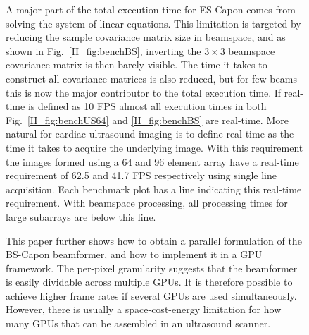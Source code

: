 \begin{figure}[!t]
A major part of the total execution time for ES-Capon comes from solving the system of linear equations. This limitation is targeted by reducing the sample covariance matrix size in beamspace, and as shown in Fig.\ \ref{II_fig:benchBS}, inverting the $3\times3$ beamspace covariance matrix is then barely visible. The time it takes to construct all covariance matrices is also reduced, but for few beams this is now the major contributor to the total execution time. If real-time is defined as 10 FPS \cite{Chen2011} almost all execution times in both Fig.\ \ref{II_fig:benchUS64} and \ref{II_fig:benchBS} are real-time. More natural for cardiac ultrasound imaging is to define real-time as the time it takes to acquire the underlying image. With this requirement the images formed using a 64 and 96 element array have a real-time requirement of 62.5 and 41.7 FPS respectively using single line acquisition. Each benchmark plot has a line indicating this real-time requirement. With beamspace processing, all processing times for large subarrays are below this line.

This paper further shows how to obtain a parallel formulation of the BS-Capon beamformer, and how to implement it in a GPU framework. The per-pixel granularity suggests that the beamformer is easily dividable across multiple GPUs. It is therefore possible to achieve higher frame rates if several GPUs are used simultaneously. However, there is usually a space-cost-energy limitation for how many GPUs that can be assembled in an ultrasound scanner.
 


\end{figure}
